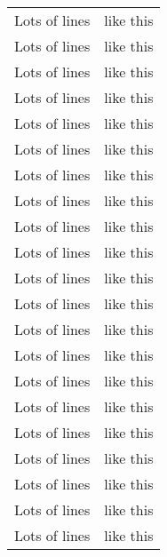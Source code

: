\documentclass[12pt, a4paper]{article}
\begin{document}
\begin{longtable}[c]{| c | c |}
 Lots of lines & like this\\
 Lots of lines & like this\\
 Lots of lines & like this\\
 Lots of lines & like this\\
 Lots of lines & like this\\
 Lots of lines & like this\\
 Lots of lines & like this\\
 Lots of lines & like this\\
 Lots of lines & like this\\
 Lots of lines & like this\\
 Lots of lines & like this\\
 Lots of lines & like this\\
 Lots of lines & like this\\
 Lots of lines & like this\\
 Lots of lines & like this\\
 Lots of lines & like this\\
 Lots of lines & like this\\
 Lots of lines & like this\\
 Lots of lines & like this\\
 Lots of lines & like this\\
 Lots of lines & like this\\
 \end{longtable}
\end{document}
